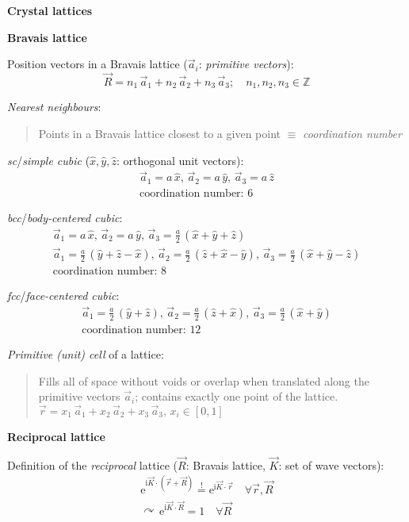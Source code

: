 \documentclass[fontsize=11pt,a4paper]{scrartcl}
\begin{document}
\textbf{\Large{Crystal lattices}}

\textbf{\normalsize{Bravais lattice}}

Position vectors in a Bravais lattice ($\vec a_i$: \emph{primitive vectors}):
\[
	\vec R=n_1\,\vec a_1+n_2\,\vec a_2+n_3\,\vec a_3;\quad n_1,n_2,n_3\in\mathbb{Z}
\]

\emph{Nearest neighbours}:
\begin{quote}
	Points in a Bravais lattice closest to a given point $\equiv$ \emph{coordination number}
\end{quote}

\emph{sc}/\emph{simple cubic} ($\hat x,\hat y,\hat z$: orthogonal unit vectors):
\begin{gather*}
	\vec a_1=a\,\hat x,\,\vec a_2=a\,\hat y,\,\vec a_3=a\,\hat z\\
	\text{coordination number: }6
\end{gather*}

\emph{bcc}/\emph{body-centered cubic}:
\begin{gather*}
	\vec a_1=a\,\hat x,\,\vec a_2=a\,\hat y,\,\vec a_3=\frac{a}{2}\,(\hat x+\hat y+\hat z)\\
	\vec a_1=\frac{a}{2}\,(\hat y+\hat z-\hat x),\,\vec a_2=\frac{a}{2}\,(\hat z+\hat x-\hat y),\,\vec a_3=\frac{a}{2}\,(\hat x+\hat y-\hat z)\\
	\text{coordination number: }8
\end{gather*}

\emph{fcc}/\emph{face-centered cubic}:
\begin{gather*}
	\vec a_1=\frac{a}{2}\,(\hat y+\hat z),\,\vec a_2=\frac{a}{2}\,(\hat z+\hat x),\,\vec a_3=\frac{a}{2}\,(\hat x+\hat y)\\
	\text{coordination number: }12
\end{gather*}

\emph{Primitive (unit) cell} of a lattice:
\begin{quote}
	Fills all of space without voids or overlap when translated along the primitive vectors $\vec a_i$; contains exactly one point of the lattice.\\
	$\vec r=x_1\,\vec a_1+x_2\,\vec a_2+x_3\,\vec a_3,\,x_i\in[0,1]$
\end{quote}

\textbf{\normalsize{Reciprocal lattice}}

Definition of the \emph{reciprocal} lattice ($\vec R$: Bravais lattice, $\vec K$: set of wave vectors):
\begin{gather*}
	\mathrm{e}^{\mathrm{i}\vec K\cdot(\vec r+\vec R)}\stackrel{!}{=}\mathrm{e}^{\mathrm{i}\vec K\cdot\vec r}\quad\forall\vec r,\vec R\\
	\curvearrowright\,\mathrm{e}^{\mathrm{i}\vec K\cdot\vec R}=1\quad\forall\vec R
\end{gather*}
\end{document}
